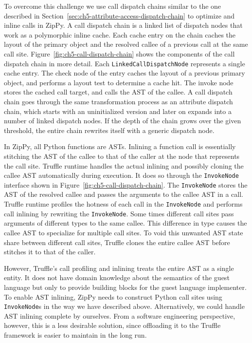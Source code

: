 To overcome this challenge we use call dispatch chains similar to the one described in Section~\ref{sec:ch5-attribute-access-dispatch-chain} to optimize and inline calls in ZipPy.
A call dispatch chain is a linked list of dispatch nodes that work as a polymorphic inline cache.
Each cache entry on the chain caches the layout of the primary object and the resolved callee of a previous call at the same call site.
Figure~\ref{fig:ch5-call-dispatch-chain} shows the components of the call dispatch chain in more detail.
Each \texttt{LinkedCallDispatchNode} represents a single cache entry.
The check node of the entry caches the layout of a previous primary object, and performs a layout test to determine a cache hit.
The invoke node stores the cached call target, and calls the AST of the callee.
A call dispatch chain goes through the same transformation process as an attribute dispatch chain, which starts with an uninitialized version and later on expands into a number of linked dispatch nodes.
If the depth of the chain grows over the given threshold, the entire chain rewrites itself with a generic dispatch node.

In ZipPy, all Python functions are ASTs.
Inlining a function call is essentially stitching the AST of the callee to that of the caller at the node that represents the call site.
Truffle runtime handles the actual inlining and possibly cloning the callee AST automatically during execution.
It does so through the \texttt{InvokeNode} interface shown in Figure~\ref{fig:ch5-call-dispatch-chain}.
The \texttt{InvokeNode} stores the AST of the resolved callee and passes the arguments to the callee AST in a call.
Truffle runtime profiles the hotness of each call in the \texttt{InvokeNode} and performs call inlining by rewriting the \texttt{InvokeNode}.
Some times different call sites pass arguments of different types to the same callee.
This difference in type causes the callee AST to specialize for multiple call sites.
To void this unwanted AST state share between different call sites, Truffle clones the entire callee AST before stitches it to that of the caller.

However, Truffle's call profiling and inlining treats the entire AST as a single entity.
It does not have domain knowledge about the semantics of the guest language but only to provide building blocks for the guest language implementer.
To enable AST inlining, ZipPy needs to construct Python call sites using \texttt{InvokeNode}s in the way we have described above.
Alternatively, we could handle AST inlining complete by ourselves.
From a software engineering perspective, however, this is a less desirable solution, since offloading it to the Truffle framework is easier to maintain in the long run.

